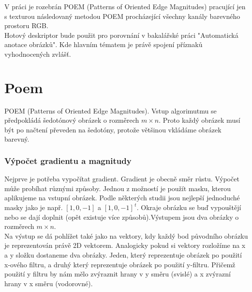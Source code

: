 \documentclass{report}
\begin{document}
V práci je rozebrán POEM (Patterns of Oriented Edge Magnitudes) pracující jen s texturou následovaný metodou POEM procházející všechny kanály barevného prostoru RGB. \\

Hotový deskriptor bude použit pro porovnání v bakalářské práci "Automatická anotace obrázků". Kde hlavním tématem je právě spojení příznaků vyhodnocených zvlášť. 

\chapter{Poem}
POEM (Patterns of Oriented Edge Magnitudes). Vstup algorimutmu se předpokládá šedotónový obrázek o rozměrech  $m \times n$. Proto každý obrázek musí být po načtení převeden na šedotóny, protože většinou vkládáme obrázek barevný. \cite{SrovnaniDeskriptoru}

\subsection{Výpočet gradientu a magnitudy}
Nejprve je potřeba vypočítat gradient. Gradient je obecně směr růstu. Výpočet může probíhat různými způsoby. Jednou z možností je použít masku, kterou aplikujeme na vstupní obrázek. Podle některých studii jsou nejlepší jednoduché masky jako je např. $[1, 0, -1]$ a $[1, 0, -1]^{\,t}$. Okraje obrázku se buď vypouštějí nebo se dají doplnit (opět existuje více způsobů).Výstupem jsou dva obrázky o rozměrech $m \times n$. \\
Na výstup se dá pohlížet také jako na vektory, kdy každý bod původního obrázku je reprezentován právě 2D vektorem. Analogicky pokud si vektory rozložíme na x a y složku dostaneme dva obrázky. Jeden, který reprezentuje obrázek po použití x-ového filtru, a druhý který reprezentuje obrázek po použití y-filtru. Přičemž použití y filtru by nám mělo zvýraznit hrany v y směru (svislé) a x zvýrazní hrany v x směru (vodorovné). \\
\end{document}
